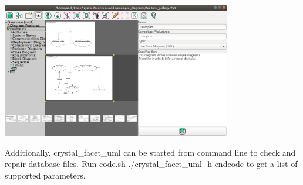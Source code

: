 \includegraphics[width=10cm]{screenshot_1.png}

Additionally, crystal\_facet\_uml can be started from command line
to check and repair database files.
Run
code{.sh}
./crystal\_facet\_uml -h
endcode
to get a list of supported parameters.

